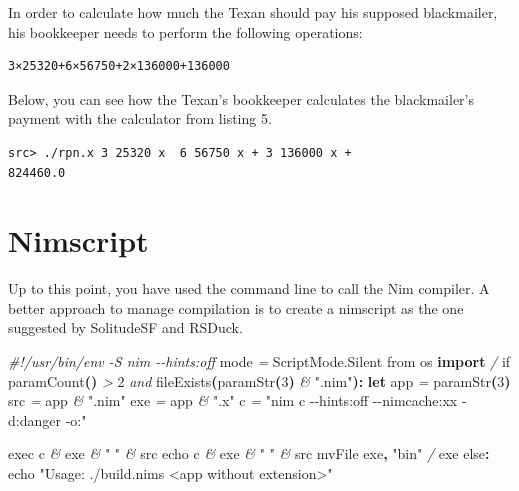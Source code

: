 \documentclass[
  12pt,
]{book}
\newenvironment{Shaded}{}{}
\newcommand{\CommentTok}[1]{\textcolor[rgb]{0.38,0.63,0.69}{\textit{#1}}}
\newcommand{\DataTypeTok}[1]{\textcolor[rgb]{0.56,0.13,0.00}{#1}}
\newcommand{\DecValTok}[1]{\textcolor[rgb]{0.25,0.63,0.44}{#1}}
\newcommand{\KeywordTok}[1]{\textcolor[rgb]{0.00,0.44,0.13}{\textbf{#1}}}
\newcommand{\NormalTok}[1]{#1}
\newcommand{\StringTok}[1]{\textcolor[rgb]{0.25,0.44,0.63}{#1}}
\begin{document}
In order to calculate how much the Texan should pay his supposed
blackmailer, his bookkeeper needs to perform the following operations:

\begin{verbatim}
3×25320+6×56750+2×136000+136000 
\end{verbatim}

Below, you can see how the Texan's bookkeeper calculates the
blackmailer's payment with the calculator from listing 5.

\begin{verbatim}
src> ./rpn.x 3 25320 x  6 56750 x + 3 136000 x +
824460.0
\end{verbatim}

\section{Nimscript}\label{nimscript}

Up to this point, you have used the command line to call the Nim
compiler. A better approach to manage compilation is to create a
nimscript as the one suggested by SolitudeSF and RSDuck.

\begin{Shaded}
\begin{Highlighting}[]
\CommentTok{\#!/usr/bin/env {-}S nim {-}{-}hints:off}
\NormalTok{mode }\CommentTok{=} \DataTypeTok{ScriptMode.Silent}
\DataTypeTok{from} \DataTypeTok{os} \KeywordTok{import}\NormalTok{ \textasciigrave{}}\CommentTok{/}\NormalTok{\textasciigrave{}}
\DataTypeTok{if} \DataTypeTok{paramCount}\KeywordTok{()} \CommentTok{\textgreater{}} \DecValTok{2} \CommentTok{and} \DataTypeTok{fileExists}\KeywordTok{(}\DataTypeTok{paramStr}\KeywordTok{(}\DecValTok{3}\KeywordTok{)} \CommentTok{\&} \StringTok{".nim"}\KeywordTok{):} 
  \KeywordTok{let}
\NormalTok{    app }\CommentTok{=} \DataTypeTok{paramStr}\KeywordTok{(}\DecValTok{3}\KeywordTok{)}
\NormalTok{    src }\CommentTok{=}\NormalTok{ app }\CommentTok{\&} \StringTok{".nim"}
\NormalTok{    exe }\CommentTok{=}\NormalTok{ app }\CommentTok{\&} \StringTok{".x"}
\NormalTok{    c }\CommentTok{=} \StringTok{"nim c {-}{-}hints:off {-}{-}nimcache:xx {-}d:danger {-}o:"}

  \DataTypeTok{exec}\NormalTok{ c }\CommentTok{\&}\NormalTok{ exe }\CommentTok{\&} \StringTok{" "} \CommentTok{\&}\NormalTok{ src}
  \DataTypeTok{echo}\NormalTok{ c }\CommentTok{\&}\NormalTok{ exe }\CommentTok{\&} \StringTok{" "} \CommentTok{\&}\NormalTok{ src}
  \DataTypeTok{mvFile}\NormalTok{ exe}\KeywordTok{,} \StringTok{"bin"} \CommentTok{/}\NormalTok{ exe}
\DataTypeTok{else}\KeywordTok{:} \DataTypeTok{echo} \StringTok{"Usage: ./build.nims \textless{}app without extension\textgreater{}"}
\end{Highlighting}
\end{Shaded}
\end{document}
